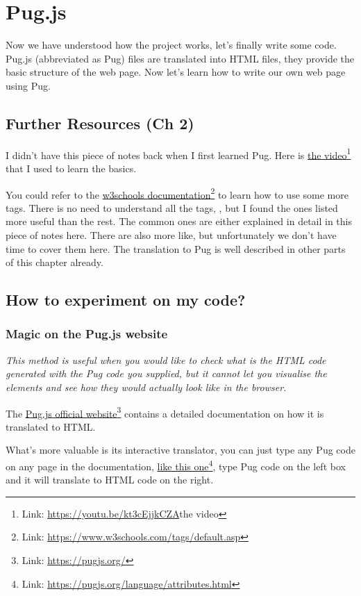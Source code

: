 \chapter{Pug.js}
\label{sec:pug1}

Now we have understood how the project works, let's finally write some code.
Pug.js (abbreviated as Pug) files are translated into HTML files, they provide the basic structure of the web page. Now let's learn how to write our own web page using Pug.

\section*{Further Resources (Ch 2)}

I didn't have this piece of notes back when I first learned Pug. Here is \href{https://youtu.be/kt3cEjjkCZA}{the video}\footnote{Link: \url{https://youtu.be/kt3cEjjkCZA}{the video}} that I used to learn the basics. 

You could refer to the \href{https://www.w3schools.com/tags/default.asp}{w3schools documentation}\footnote{Link: \url{https://www.w3schools.com/tags/default.asp}} to learn how to use some more tags. There is no need to understand all the tags, , but I found the ones listed more useful than the rest. The common ones are either explained in detail in this piece of notes here. There are also more like, but unfortunately we don't have time to cover them here. The translation to Pug is well described in other parts of this chapter already.

\section{How to experiment on my code?}
\subsection*{Magic on the Pug.js website}

\textit{This method is useful when you would like to check what is the HTML code generated with the Pug code you supplied, but it cannot let you visualise the elements and see how they would actually look like in the browser.}
\vspace{6mm}

The \href{{https://pugjs.org/}}{Pug.js official website}\footnote{Link: \url{https://pugjs.org/}} contains a detailed documentation on how it is translated to HTML.

What's more valuable is its interactive translator, you can just type any Pug code on any page in the documentation, \href{https://pugjs.org/language/attributes.html}{like this one}\footnote{Link: \url{https://pugjs.org/language/attributes.html}}, type Pug code on the left box and it will translate to HTML code on the right.

